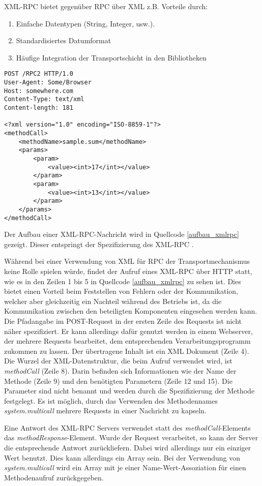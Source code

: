 XML-RPC bietet gegenüber RPC über XML z.B. Vorteile durch:
\begin{enumerate}
\item Einfache Datentypen (String, Integer, usw.).
\item Standardisiertes Datumformat
\item Häufige Integration der Transportschicht in den Bibliotheken
\end{enumerate}
\lstset{language=XML}
\begin{lstlisting}[frame=single,caption={Aufbau einer XML-RPC-Nachricht},label={aufbau_xmlrpc}]
POST /RPC2 HTTP/1.0
User-Agent: Some/Browser
Host: somewhere.com
Content-Type: text/xml
Content-length: 181

<?xml version="1.0" encoding="ISO-8859-1"?>
<methodCall>
	<methodName>sample.sum</methodName>
	<params>
		<param>
			<value><int>17</int></value>
		</param>
		<param>
			<value><int>13</int></value>
		</param>
	</params>
</methodCall>
\end{lstlisting}
Der Aufbau einer XML-RPC-Nachricht wird in Quellcode \ref{aufbau_xmlrpc} gezeigt.
Dieser entspringt der Spezifizierung des XML-RPC \cite{xmlrpc}.

Während bei einer Verwendung von XML für RPC der Transportmechanismus keine Rolle spielen würde, findet
der Aufruf eines XML-RPC über HTTP statt, wie es in den Zeilen 1 bis 5 in Quellcode \ref{aufbau_xmlrpc} zu sehen ist.
Dies bietet einen Vorteil beim Feststellen von Fehlern oder der Kommunikation, welcher aber gleichzeitig
ein Nachteil während des Betriebs ist, da die Kommunikation zwischen den beteiligten Komponenten
eingesehen werden kann.
Die Pfadangabe im POST-Request in der ersten Zeile des Requests ist nicht näher spezifiziert.
Er kann allerdings dafür genutzt werden in einem Webserver, der mehrere Requests bearbeitet, dem entsprechenden
Verarbeitungsprogramm zukommen zu lassen.
Der übertragene Inhalt ist ein XML Dokument (Zeile 4).
Die Wurzel der XML-Datenstruktur, die beim Aufruf verwendet wird, ist \emph{methodCall} (Zeile 8).
Darin befinden sich Informationen wie der Name der Methode (Zeile 9) und den benötigten Parametern (Zeile 12 und 15).
Die Parameter sind nicht benannt und werden durch die Spezifizierung der Methode festgelegt.
Es ist möglich, durch das Verwenden des Methodennames \emph{system.multicall} mehrere Requests
in einer Nachricht zu kapseln.

Eine Antwort des XML-RPC Servers verwendet statt des \emph{methodCall}-Elements das \emph{methodResponse}-Element.
Wurde der Request verarbeitet, so kann der Server die entsprechende Antwort zurückliefern.
Dabei wird allerdings nur ein einziger Wert benutzt.
Dies kann allerdings ein Array sein.
Bei der Verwendung von \emph{system.multicall} wird ein Array mit je einer Name-Wert-Assoziation
für einen Methodenaufruf zurückgegeben.

